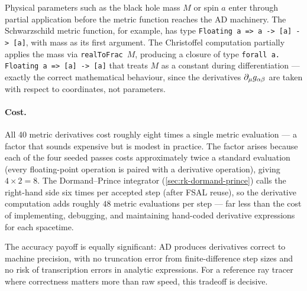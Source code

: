 Physical parameters such as the black hole mass $M$ or spin
$a$ enter through partial application before the metric
function reaches the AD machinery.  The Schwarzschild metric
function, for example, has type
\texttt{Floating a => a -> [a] -> [a]}, with mass as its
first argument.  The Christoffel computation partially
applies the mass via \texttt{realToFrac}~$M$,
producing a closure of type
\texttt{forall a. Floating a => [a] -> [a]} that treats
$M$ as a constant during differentiation --- exactly the
correct mathematical behaviour, since the derivatives
$\partial_{\mu} g_{\alpha\beta}$ are taken with respect to
coordinates, not parameters.

\paragraph{Cost.}

All 40 metric derivatives cost roughly eight times a single
metric evaluation --- a factor that sounds expensive but is
modest in practice.  The factor arises because each of the
four seeded passes costs
approximately twice a standard evaluation (every
floating-point operation is paired with a derivative
operation), giving $4 \times 2 = 8$.  The Dormand--Prince
integrator (\cref{sec:rk-dormand-prince}) calls the
right-hand side six times per accepted step (after FSAL
reuse), so the derivative computation adds roughly $48$
metric evaluations per step --- far less than the cost of
implementing, debugging, and maintaining hand-coded
derivative expressions for each spacetime.

The accuracy payoff is equally significant: AD produces
derivatives correct to machine precision, with no truncation
error from finite-difference step sizes and no risk of
transcription errors in analytic expressions.  For a
reference ray tracer where correctness matters more than raw
speed, this tradeoff is decisive.

